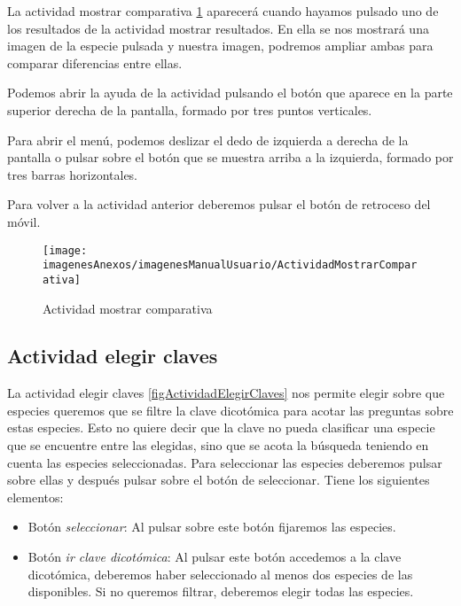La actividad mostrar comparativa \ref{figActividadMostrarComparativa} aparecerá cuando hayamos pulsado uno de los resultados de la actividad mostrar resultados. En ella se nos mostrará una imagen de la especie pulsada y nuestra imagen, podremos ampliar ambas para comparar diferencias entre ellas.

Podemos abrir la ayuda de la actividad pulsando el botón que aparece en la parte superior derecha de la pantalla, formado por tres puntos verticales.

Para abrir el menú, podemos deslizar el dedo de izquierda a derecha de la pantalla o pulsar sobre el botón que se muestra arriba a la izquierda, formado por tres barras horizontales.

Para volver a la actividad anterior deberemos pulsar el botón de retroceso del móvil.

\begin{figure}[h]
    \begin{center}%
        \begin{center}%
          \texttt{[image: imagenesAnexos/imagenesManualUsuario/ActividadMostrarComparativa]}%
          \caption{Actividad mostrar comparativa}%
          \label{figActividadMostrarComparativa}%
        \end{center}%
  	\end{center}%
\end{figure}%
\newpage

\subsection{Actividad elegir claves}

La actividad elegir claves \ref{figActividadElegirClaves} nos permite elegir sobre que especies queremos que se filtre la clave dicotómica para acotar las preguntas sobre estas especies. Esto no quiere decir que la clave no pueda clasificar una especie que se encuentre entre las elegidas, sino que se acota la búsqueda teniendo en cuenta las especies seleccionadas. Para seleccionar las especies deberemos pulsar sobre ellas y después pulsar sobre el botón de seleccionar. Tiene los siguientes elementos:

\begin{itemize}
	\item Botón \textit{seleccionar}: Al pulsar sobre este botón fijaremos las especies.
	\item Botón \textit{ir clave dicotómica}: Al pulsar este botón accedemos a la clave dicotómica, deberemos haber seleccionado al menos dos especies de las disponibles. Si no queremos filtrar, deberemos elegir todas las especies.
\end{itemize}

